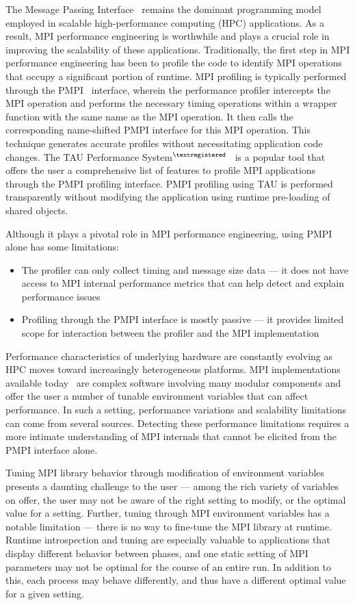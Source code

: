 The Message Passing Interface~\cite{MPI_3_1} remains the dominant programming model employed in scalable high-performance computing (HPC) applications. As a result, MPI performance engineering is worthwhile and plays a crucial role in improving the scalability of these applications. Traditionally, the first step in MPI performance engineering has been to profile the code to identify MPI operations that occupy a significant portion of runtime. MPI profiling is typically performed through the PMPI~\cite{PMPI} interface, wherein the performance profiler intercepts the MPI operation and performs the necessary timing operations within a wrapper function with the same name as the MPI operation. It then calls the corresponding name-shifted PMPI interface for this MPI operation. This technique generates accurate profiles without necessitating application code changes. The TAU Performance System$^{\textregistered}$~\cite{Shende:2006:TPP:1125980.1125982} is a popular tool that offers the user a comprehensive list of features to profile MPI applications through the PMPI profiling interface. PMPI profiling using TAU is performed transparently without modifying the application using runtime pre-loading of shared objects. \par
Although it plays a pivotal role in MPI performance engineering, using PMPI alone has some limitations:
\begin{itemize}
\item The profiler can only collect timing and message size data --- it does not have access to MPI internal performance metrics that can help detect and explain performance issues
\item Profiling through the PMPI interface is mostly passive --- it provides limited scope for interaction between the profiler and the MPI implementation
\end{itemize}
\par Performance characteristics of underlying hardware are constantly evolving as HPC moves toward increasingly heterogeneous platforms. MPI implementations available today~\cite{MVAPICH2,OpenMPI,MPICH,pjn2008} are complex software involving many modular components and offer the user a number of tunable environment variables that can affect performance. In such a setting, performance variations and scalability limitations can come from several sources. Detecting these performance limitations requires a more intimate understanding of MPI internals that cannot be elicited from the PMPI interface alone. \par
Tuning MPI library behavior through modification of environment variables presents a daunting challenge to the user --- among the rich variety of variables on offer, the user may not be aware of the right setting to modify, or the optimal value for a setting. Further, tuning through MPI environment variables has a notable limitation --- there is no way to fine-tune the MPI library at runtime. Runtime introspection and tuning are especially valuable to applications that display different behavior between phases, and one static setting of MPI parameters may not be optimal for the course of an entire run. In addition to this, each process may behave differently, and thus have a different optimal value for a given setting. \par
